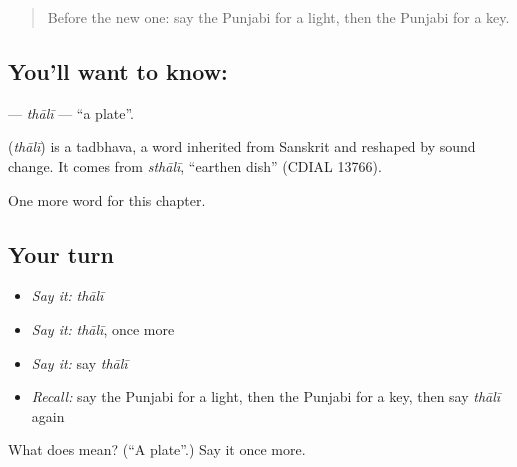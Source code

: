 \label{lesson:PA-C69-thali}



\begin{quote}
Before the new one: say the Punjabi for a light, then the Punjabi for a key.
\end{quote}

\subsection*{You'll want to know: }
\textbf{} — \emph{thālī} — \textquotedblleft{}a plate\textquotedblright{}.

\begin{cousinweb}
\textbf{} (\emph{thālī}) is a tadbhava, a word inherited from Sanskrit and reshaped by sound change. It comes from \emph{sthālī}, \textquotedblleft{}earthen dish\textquotedblright{} (CDIAL 13766).
\end{cousinweb}

\begin{grammarlens}[title={What you've built}]
One more word for this chapter.
\end{grammarlens}

\subsection*{Your turn}
\begin{itemize}
\raggedright
  \item \emph{Say it:} \emph{thālī}
  \item \emph{Say it:} \emph{thālī}, once more
  \item \emph{Say it:} say \emph{thālī}
  \item \emph{Recall:} say the Punjabi for a light, then the Punjabi for a key, then say \emph{thālī} again
\end{itemize}

\begin{tcolorbox}[breakable,colback=teal!4,colframe=teal!35!black,title={Before you move on}]
What does  mean? (\textquotedblleft{}A plate\textquotedblright{}.) Say it once more.
\end{tcolorbox}
